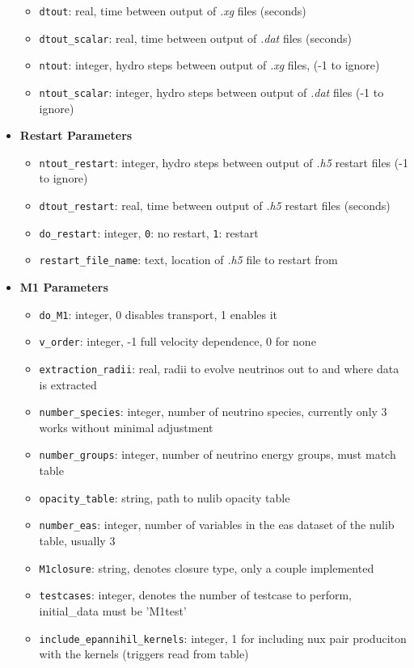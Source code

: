 \documentclass[10pt,nofootinbib]{article}
\newcommand{\code}[1]{\texttt{#1}}
\begin{document}
\begin{itemize}
\begin{itemize}
\item{{\tt dtout}: real, time between output of {\it .xg} files (seconds)}
\item{{\tt dtout\_scalar}: real, time between output of {\it .dat} files (seconds)}
\item{{\tt ntout}: integer, hydro steps between output of {\it .xg} files, (-1 to ignore)}
\item{{\tt ntout\_scalar}: integer, hydro steps between output of {\it .dat} files (-1 to ignore)}
\end{itemize}
\item{{\bf Restart Parameters}}
\begin{itemize}
\item{{\tt ntout\_restart}: integer, hydro steps between output of {\it .h5} restart files (-1 to ignore)}
\item{{\tt dtout\_restart}: real, time between output of {\it .h5} restart files (seconds)}
\item{{\tt do\_restart}: integer, \code{0}: no restart, \code{1}: restart}
\item{{\tt restart\_file\_name}: text, location of {\it .h5} file to restart from}
\end{itemize}
\item{{\bf M1 Parameters}}
\begin{itemize}
\item{{\tt do\_M1}: integer, 0 disables transport, 1 enables it}
\item{{\tt v\_order}: integer, -1 full velocity dependence, 0 for none}
\item{{\tt extraction\_radii}: real, radii to evolve neutrinos out to and where data is extracted}
\item{{\tt number\_species}: integer, number of neutrino species, currently only 3 works without minimal adjustment}
\item{{\tt number\_groups}: integer, number of neutrino energy groups, must match table}
\item{{\tt opacity\_table}: string, path to nulib opacity table}
\item{{\tt number\_eas}: integer, number of variables in the eas dataset of the nulib table, usually 3}
\item{{\tt M1closure}: string, denotes closure type, only a couple implemented}
\item{{\tt testcases}: integer, denotes the number of testcase to perform, initial\_data must be 'M1test'}
\item{{\tt include\_epannihil\_kernels}: integer, 1 for including nux pair produciton with the kernels (triggers read from table)}

\end{itemize}
\end{itemize}
\end{document}
